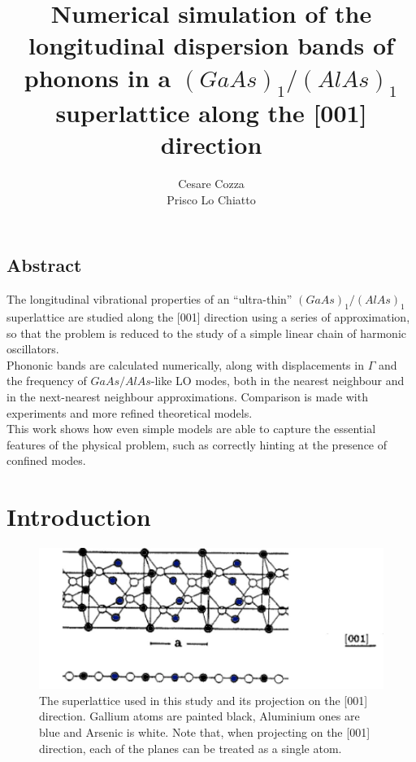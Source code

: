 \documentclass{article}
\begin{document}
 
	
	\author{Cesare Cozza \\ Prisco Lo Chiatto }
	\title{Numerical simulation of the longitudinal dispersion bands of phonons in a $(GaAs)_1/(AlAs)_1$ superlattice along the [001] direction}
	\maketitle
    
	\begin{center}
	\section*{Abstract}
	\end{center}
	

	The longitudinal vibrational properties of an “ultra-thin” $(GaAs)_1/(AlAs)_1$ superlattice are studied along the [001] direction using a series of approximation, so that the problem is reduced to the study of a simple linear chain of harmonic oscillators.\\
	Phononic bands are calculated numerically, along with displacements in $\Gamma$ and the frequency of $GaAs/AlAs$-like LO modes, both in the nearest neighbour and in the next-nearest neighbour approximations. Comparison is made with experiments and more refined theoretical models.\\
This work shows how even simple models are able to capture the essential features of the physical problem, such as correctly hinting at the presence of confined modes.


    \newpage
\section*{Introduction}
\begin{figure}
	\centering
	\includegraphics[scale=0.3]{reticolo.jpg}
	\caption{The superlattice used in this study and its projection on the [001] direction. Gallium atoms are painted black, Aluminium ones are blue and Arsenic is white. Note that, when projecting on the [001] direction, each of the planes can be treated as a single atom.}
	\label{fig:reticolo}
\end{figure}
\end{document}
